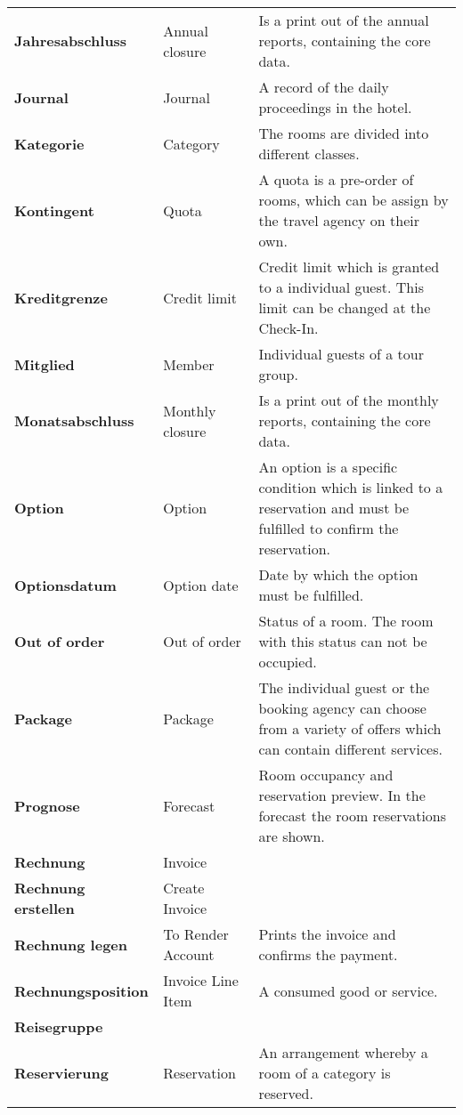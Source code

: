 \documentclass[../Pflichtenheft.tex]{subfiles}
\begin{document}
\begin{longtable}{p{4cm} p{4cm} p{6cm}}
		\textbf{Jahresabschluss} & {Annual closure} & Is a print out of the annual reports, containing the core data. \\[0.5cm]
		\textbf{Journal} & {Journal} & A record of the daily proceedings in the hotel. \\[0.5cm]
        \textbf{Kategorie} & {Category} & The rooms are divided into different classes. \\[0.5cm]
        \textbf{Kontingent} & {Quota} & A quota is a pre-order of rooms, which can be assign by the travel agency on their own. \\[0.5cm]
        \textbf{Kreditgrenze} & {Credit limit} & Credit limit which is granted to a individual guest. This limit can be changed at the Check-In. \\[0.5cm]
        \textbf{Mitglied} & {Member} & Individual guests of a tour group. \\[0.5cm]
        \textbf{Monatsabschluss} & {Monthly closure} & Is a print out of the monthly reports, containing the core data. \\[0.5cm]
        \textbf{Option} & {Option} & An option is a specific condition which is linked to a reservation and must be fulfilled to confirm the reservation. \\[0.5cm]
        \textbf{Optionsdatum} & {Option date} & Date by which the option must be fulfilled. \\[0.5cm]
        \textbf{Out of order} & {Out of order} & Status of a room. The room with this status can not be occupied. \\[0.5cm]
        \textbf{Package} & {Package} & The individual guest or the booking agency can choose from a variety of offers which can contain different services. \\[0.5cm]
        \textbf{Prognose} & {Forecast} & Room occupancy and reservation preview. In the forecast the room reservations are shown. \\[0.5cm]
        \textbf{Rechnung} & {Invoice} &  \\[0.5cm]
        \textbf{Rechnung erstellen} & {Create Invoice} & \\[0.5cm]
        \textbf{Rechnung legen} & {To Render Account} & Prints the invoice and confirms the payment. \\[0.5cm]
        \textbf{Rechnungsposition} & {Invoice Line Item} & A consumed good or service. \\[0.5cm]
        \textbf{Reisegruppe} & \\[0.5cm]
        \textbf{Reservierung} & {Reservation} & An arrangement whereby a room of a category is reserved. \\[0.5cm]

\end{longtable}
\end{document}
